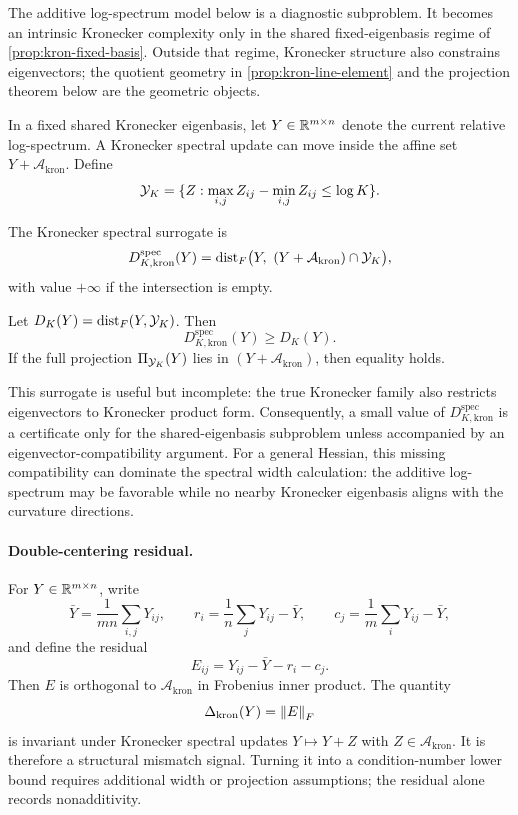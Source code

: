 \begin{remark}
The additive log-spectrum model below is a diagnostic subproblem. It becomes an
intrinsic Kronecker complexity only in the shared fixed-eigenbasis regime of
\cref{prop:kron-fixed-basis}. Outside that regime, Kronecker structure also
constrains eigenvectors; the quotient geometry in
\cref{prop:kron-line-element} and the projection theorem below are the
geometric objects.
\end{remark}

In a fixed shared Kronecker eigenbasis, let \(Y\in\mathbb R^{m\times n}\) denote the
current relative log-spectrum. A Kronecker spectral update can move inside the
affine set \(Y+\mathcal A_{\mathrm{kron}}\). Define
\[
  \mathcal Y_K=\{Z:\max_{i,j}Z_{ij}-\min_{i,j}Z_{ij}\le\log K\}.
\]

\begin{definition}
The Kronecker spectral surrogate is
\[
  D_{K,\mathrm{kron}}^{\mathrm{spec}}(Y)
  =
  \operatorname{dist}_F\bigl(
  Y,\ (Y+\mathcal A_{\mathrm{kron}})\cap\mathcal Y_K
  \bigr),
\]
with value \(+\infty\) if the intersection is empty.
\end{definition}

\begin{proposition}
\label{prop:kron-spec-lower}
Let \(D_K(Y)=\operatorname{dist}_F(Y,\mathcal Y_K)\). Then
\[
  D_{K,\mathrm{kron}}^{\mathrm{spec}}(Y)\ge D_K(Y).
\]
If the full projection \(\Pi_{\mathcal Y_K}(Y)\) lies in
\((Y+\mathcal A_{\mathrm{kron}})\), then equality holds.
\end{proposition}

This surrogate is useful but incomplete: the true Kronecker family also
restricts eigenvectors to Kronecker product form.
Consequently, a small value of \(D_{K,\mathrm{kron}}^{\mathrm{spec}}\) is a
certificate only for the shared-eigenbasis subproblem unless accompanied by an
eigenvector-compatibility argument.
For a general Hessian, this missing compatibility can dominate the spectral
width calculation: the additive log-spectrum may be favorable while no nearby
Kronecker eigenbasis aligns with the curvature directions.

\paragraph{Double-centering residual.}
For \(Y\in\mathbb R^{m\times n}\), write
\[
  \bar Y=\frac{1}{mn}\sum_{i,j}Y_{ij},\qquad
  r_i=\frac1n\sum_jY_{ij}-\bar Y,\qquad
  c_j=\frac1m\sum_iY_{ij}-\bar Y,
\]
and define the residual
\[
  E_{ij}=Y_{ij}-\bar Y-r_i-c_j.
\]
Then \(E\) is orthogonal to \(\mathcal A_{\mathrm{kron}}\) in Frobenius inner
product. The quantity
\[
  \Delta_{\mathrm{kron}}(Y)=\left\lVert E\right\rVert_F
\]
is invariant under Kronecker spectral updates \(Y\mapsto Y+Z\) with
\(Z\in\mathcal A_{\mathrm{kron}}\). It is therefore a structural mismatch
signal. Turning it into a condition-number lower bound requires additional
width or projection assumptions; the residual alone records nonadditivity.

